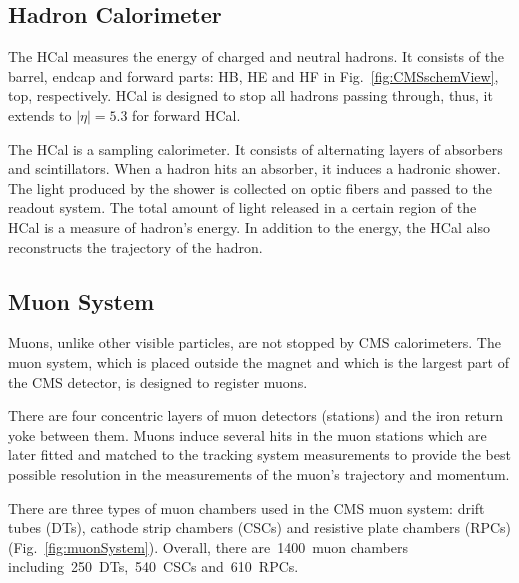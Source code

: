 
\subsection{Hadron Calorimeter}

The HCal measures the energy of charged and neutral hadrons. It consists of the barrel, endcap and forward parts: HB, HE and HF in Fig.~\ref{fig:CMSschemView}, top, respectively. HCal is designed to stop all hadrons passing through, thus, it extends to $|\eta|=5.3$ for forward HCal.

The HCal is a sampling calorimeter. It consists of alternating layers of absorbers and scintillators. When a hadron hits an absorber, it induces a hadronic shower. The light produced by the shower is collected on optic fibers and passed to the readout system. The total amount of light released in a certain region of the HCal is a measure of hadron's energy. In addition to the energy, the HCal also reconstructs the trajectory of the hadron.   

\subsection{Muon System}

Muons, unlike other visible particles, are not stopped by CMS calorimeters. The muon system, which is placed outside the magnet and which is the largest part of the CMS detector, is designed to register muons.

There are four concentric layers of muon detectors (stations) and the iron return yoke between them. Muons induce several hits in the muon stations which are later fitted and matched to the tracking system measurements to provide the best possible resolution in the measurements of the muon's trajectory and momentum.

There are three types of muon chambers used in the CMS muon system: drift tubes (DTs), cathode strip chambers (CSCs) and resistive plate chambers (RPCs) (Fig.~\ref{fig:muonSystem}). Overall, there are~1400~muon chambers including~250~DTs,~540~CSCs and~610~RPCs.


